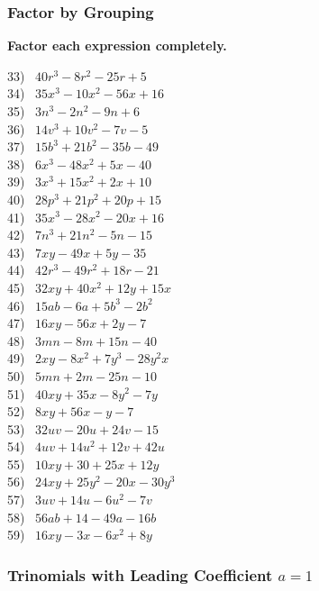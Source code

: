 \documentclass[12pt]{book}
\theoremstyle{definition}
\begin{document}
\subsubsection{Factor by Grouping}

{\bf Factor each expression completely.}

\begin{multicols}{3}
  33)~ $40 r^3 - 8 r^2 - 25 r + 5$\\
  34)~ $35 x^3 - 10 x^2 - 56 x + 16$\\
  35)~ $3 n^3 - 2 n^2 - 9 n + 6$\\
  36)~ $14 v^3 + 10 v^2 - 7 v - 5$\\
  37)~ $15 b^3 + 21 b^2 - 35 b - 49$\\
  38)~ $6 x^3 - 48 x^2 + 5 x - 40$\\
  39)~ $3 x^3 + 15 x^2 + 2 x + 10$\\
  40)~ $28 p^3 + 21 p^2 + 20 p + 15$\\
  41)~ $35 x^3 - 28 x^2 - 20 x + 16$\\
  42)~ $7 n^3 + 21 n^2 - 5 n - 15$\\
  43)~ $7 x y - 49 x + 5 y - 35$\\
  44)~ $42 r^3 - 49 r^2 + 18 r - 21$\\
  45)~ $32 x y + 40 x^2 + 12 y + 15 x$\\
  46)~ $15 a b - 6 a + 5 b^3 - 2 b^2$\\
  47)~ $16 x y - 56 x + 2 y - 7$\\
  48)~ $3 m n - 8 m + 15 n - 40$\\
  49)~ $2 x y - 8 x^2 + 7 y^3 - 28 y^2 x$\\
  50)~ $5 m n + 2 m - 25 n - 10$\\
  51)~ $40 x y + 35 x - 8 y^2 - 7 y$\\
  52)~ $8 x y + 56 x - y - 7$\\
  53)~ $32 u v - 20 u + 24 v - 15$\\
  54)~ $4 u v + 14 u^2 + 12 v + 42 u$\\
  55)~ $10 x y + 30 + 25 x + 12 y$\\
  56)~ $24 x y + 25 y^2 - 20 x - 30 y^3$\\
  57)~ $3 u v + 14 u - 6 u^2 - 7 v$\\
  58)~ $56 a b + 14 - 49 a - 16 b$\\
  59)~ $16 x y - 3 x - 6 x^2 + 8 y$
\end{multicols}

\subsubsection{Trinomials with Leading Coefficient $a=1$}
\end{document}
